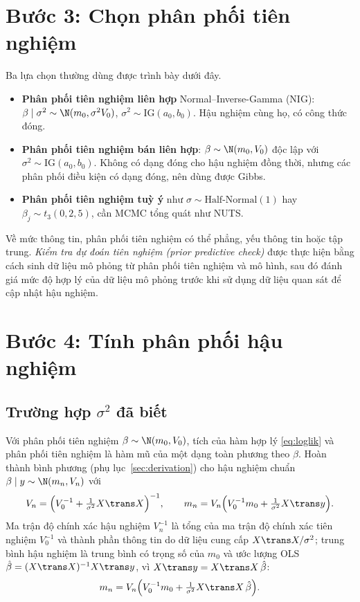 \documentclass[12pt,a4paper]{report}
\begin{document}
\section{Bước 3: Chọn phân phối tiên nghiệm}
\label{sec:step-prior}

Ba lựa chọn thường dùng được trình bày dưới đây.

\begin{itemize}
  \item \textbf{Phân phối tiên nghiệm liên hợp} Normal--Inverse-Gamma (NIG):
    $\beta \mid \sigma^2 \sim \N(m_0, \sigma^2 V_0)$,
    $\sigma^2 \sim \text{IG}(a_0, b_0)$. Hậu nghiệm cùng họ, có công thức đóng.
  \item \textbf{Phân phối tiên nghiệm bán liên hợp}: $\beta \sim \N(m_0, V_0)$ độc lập với
    $\sigma^2 \sim \text{IG}(a_0, b_0)$. Không có dạng đóng cho hậu nghiệm đồng
    thời, nhưng các phân phối điều kiện có dạng đóng, nên dùng được Gibbs.
  \item \textbf{Phân phối tiên nghiệm tuỳ ý} như $\sigma \sim \text{Half-Normal}(1)$ hay
    $\beta_j \sim t_3(0, 2{,}5)$, cần MCMC tổng quát như NUTS.
\end{itemize}

Về mức thông tin, phân phối tiên nghiệm có thể phẳng, yếu thông tin hoặc tập trung.
\emph{Kiểm tra dự đoán tiên nghiệm (prior predictive check)} được thực hiện bằng
cách sinh dữ liệu mô phỏng từ phân phối tiên nghiệm và mô hình,
sau đó đánh giá mức độ hợp lý của dữ liệu mô phỏng trước khi sử dụng dữ liệu
quan sát để cập nhật hậu nghiệm.

\section{Bước 4: Tính phân phối hậu nghiệm}
\label{sec:step-posterior}

\subsection{Trường hợp $\sigma^2$ đã biết}

Với phân phối tiên nghiệm $\beta \sim \N(m_0, V_0)$, tích của hàm hợp lý \eqref{eq:loglik} và
phân phối tiên nghiệm là hàm mũ của một dạng toàn phương theo $\beta$. Hoàn thành bình phương
(phụ lục~\ref{sec:derivation}) cho hậu nghiệm chuẩn $\beta \mid y \sim
\N(m_n, V_n)$ với
%
\begin{equation}
  \label{eq:known-sigma}
  V_n = \Bigl(V_0^{-1} + \tfrac{1}{\sigma^2} X\trans X\Bigr)^{-1},
  \qquad
  m_n = V_n \Bigl(V_0^{-1} m_0 + \tfrac{1}{\sigma^2} X\trans y\Bigr).
\end{equation}
%
Ma trận độ chính xác hậu nghiệm $V_n^{-1}$ là tổng của ma trận độ chính xác
tiên nghiệm $V_0^{-1}$ và thành phần thông tin do dữ liệu cung cấp
$X\trans X / \sigma^2$; trung bình hậu nghiệm là trung bình
có trọng số của $m_0$ và ước lượng OLS $\hat\beta = (X\trans X)^{-1}X\trans y$,
vì $X\trans y = X\trans X\, \hat\beta$:
%
\begin{equation}
  \label{eq:weighted}
  m_n = V_n \Bigl( V_0^{-1} m_0 + \tfrac{1}{\sigma^2} X\trans X\, \hat\beta \Bigr).
\end{equation}
\end{document}
